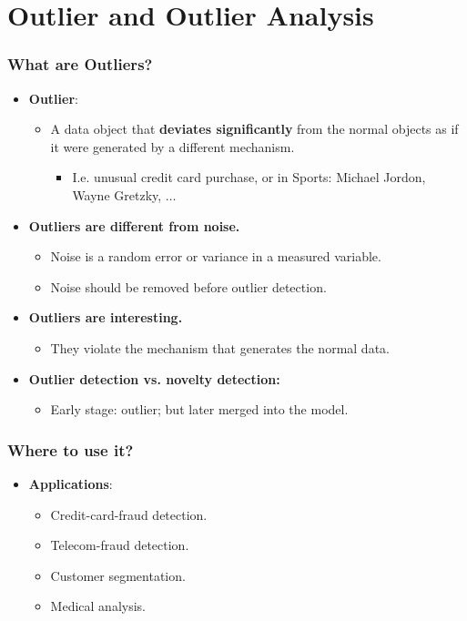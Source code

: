 \section{Outlier and Outlier Analysis}


\begin{frame}
	\frametitle{What are Outliers?}
	\begin{itemize}
		\item \textbf{Outlier}:
		      \begin{itemize}
			      \item A data object that \textbf{\color{airforceblue}deviates significantly} from the normal objects as if it were generated by a different mechanism.
			            \begin{itemize}
				            \item I.e. unusual credit card purchase, or in Sports: Michael Jordon, Wayne Gretzky, $\ldots$
			            \end{itemize}
		      \end{itemize}
		\item \textbf{Outliers are different from noise.}
		      \begin{itemize}
			      \item Noise is a random error or variance in a measured variable.
			      \item Noise should be removed before outlier detection.
		      \end{itemize}
		\item \textbf{Outliers are interesting.}
		      \begin{itemize}
			      \item They violate the mechanism that generates the normal data.
		      \end{itemize}
		\item \textbf{Outlier detection vs. novelty detection:}
		      \begin{itemize}
			      \item Early stage: outlier; but later merged into the model.
		      \end{itemize}
	\end{itemize}
\end{frame}


\begin{frame}
	\frametitle{Where to use it?}
	\begin{itemize}
		\item \textbf{Applications}:
		      \begin{itemize}
			      \item Credit-card-fraud detection.
			      \item Telecom-fraud detection.
			      \item Customer segmentation.
			      \item Medical analysis.
		      \end{itemize}
	\end{itemize}
\end{frame}


